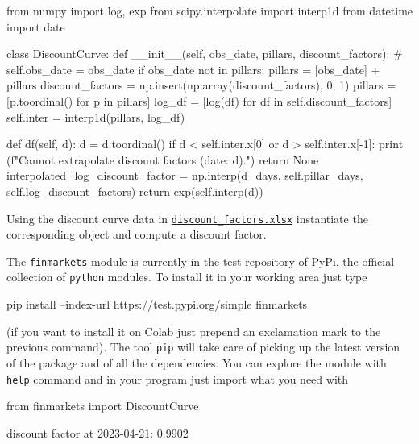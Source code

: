 \begin{ipython}
from numpy import log, exp
from scipy.interpolate import interp1d
from datetime import date

class DiscountCurve:
    def __init__(self, obs_date, pillars, discount_factors):
#        self.obs_date = obs_date
        if obs_date not in pillars:
            pillars = [obs_date] + pillars
            discount_factors = np.insert(np.array(discount_factors), 0, 1)
        pillars = [p.toordinal() for p in pillars]
        log_df = [log(df) for df in self.discount_factors]
        self.inter = interp1d(pillars, log_df)
        
    def df(self, d):
        d = d.toordinal()
        if d < self.inter.x[0] or d > self.inter.x[-1]:
            print (f"Cannot extrapolate discount factors (date: {d}).")
            return None
        interpolated_log_discount_factor = np.interp(d_days, self.pillar_days, self.log_discount_factors)
        return exp(self.interp(d))
\end{ipython}

Using the discount curve data in \href{https://github.com/matteosan1/finance_course/raw/master/input_files/discount_factors_2022-10-05.xlsx}{\texttt{discount\_factors.xlsx}} instantiate the corresponding object and compute a discount factor.

\begin{finmarkets}
The \texttt{finmarkets} module is currently in the test repository of PyPi, the official collection of \texttt{python} modules. 
To install it in your working area just type 

\begin{ioutput}
pip install --index-url https://test.pypi.org/simple finmarkets
\end{ioutput}

(if you want to install it on Colab just prepend an exclamation mark to the previous command). The tool \texttt{pip} will take care of picking up the latest version of the package and of all the dependencies. You can explore the module with \texttt{help} command and in your program just import what you need with

\begin{ipython}
from finmarkets import DiscountCurve
\end{ipython}
\end{finmarkets}

\begin{ioutput}
discount factor at 2023-04-21: 0.9902
\end{ioutput}


